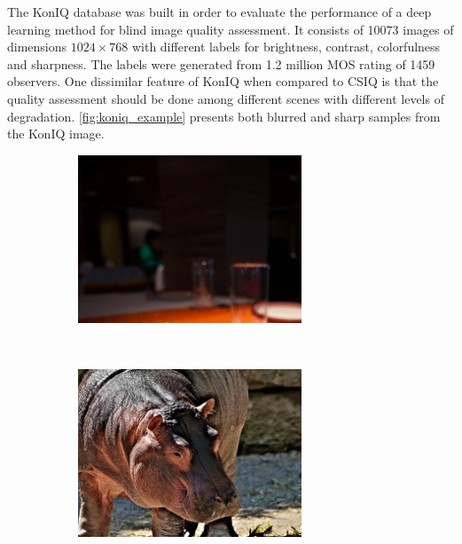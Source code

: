The KonIQ database was built in order to evaluate the performance of a deep learning method for blind image quality assessment. It consists of 10073 images of dimensions $1024 \times 768$ with different labels for brightness, contrast, colorfulness and sharpness. The labels were generated from 1.2 million MOS rating of 1459 observers. One dissimilar feature of KonIQ when compared to CSIQ is that the quality assessment should be done among different scenes with different levels of degradation. \autoref{fig:koniq_example} presents both blurred and sharp samples from the KonIQ image.

\begin{figure}[ht]
    \centering
    \caption{Samples from the KonIQ database: blurred image (a) and sharp image (b).}
    \label{fig:koniq_example}
    \begin{subfigure}[t]{0.45\textwidth}
        \centering
        \includegraphics[height=5cm]{images/koniq-blurred.jpg}
        \caption{}
    \end{subfigure}%
    ~ 
    \begin{subfigure}[t]{0.45\textwidth}
        \centering
        \includegraphics[height=5cm]{images/koniq-sharp.jpg}
        \caption{}
    \end{subfigure}
    \centering
\end{figure}
